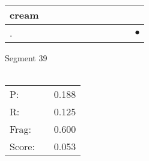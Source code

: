 \documentclass[landscape]{article}
\newcommand{\ssp}{\hspace{2pt}}
\newcommand{\mex}{\cellcolor{g}$\bullet$}
\begin{document}
\begin{tabular}{|l|p{10pt}|p{10pt}|p{10pt}|p{10pt}|p{10pt}|p{10pt}|p{10pt}|p{10pt}|p{10pt}|p{10pt}|}
\hline
\ssp cream \ssp&\hspace{2pt}&\hspace{2pt}&\hspace{2pt}&\hspace{2pt}&\hspace{2pt}&\hspace{2pt}&\hspace{2pt}&\hspace{2pt}&\hspace{2pt}&\hspace{2pt}\\
\hline
\ssp \cellcolor{ref9}. \ssp&\hspace{2pt}&\hspace{2pt}&\hspace{2pt}&\hspace{2pt}&\hspace{2pt}&\hspace{2pt}&\hspace{2pt}&\hspace{2pt}&\hspace{2pt}&\hspace{2pt}\mex\\
\hline
\end{tabular}

\vspace{6pt}
\noindent Segment 39\\\\
\noindent\begin{tabular}{lm{12pt}r}
\hline
P:&&0.188\\
R:&&0.125\\
Frag:&&0.600\\
Score:&&0.053\\
\end{tabular}

\newpage
\end{document}
